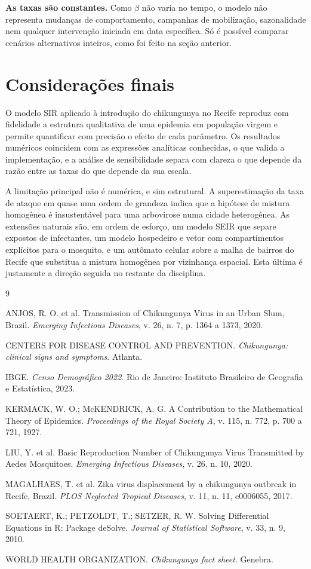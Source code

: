 \documentclass[11pt,a4paper]{article}
\begin{document}
\textbf{As taxas são constantes.} Como $\beta$ não varia no tempo, o modelo não representa mudanças de
comportamento, campanhas de mobilização, sazonalidade nem qualquer intervenção iniciada em data
específica. Só é possível comparar cenários alternativos inteiros, como foi feito na seção anterior.

\section{Considerações finais}

O modelo SIR aplicado à introdução do chikungunya no Recife reproduz com fidelidade a estrutura
qualitativa de uma epidemia em população virgem e permite quantificar com precisão o efeito de cada
parâmetro. Os resultados numéricos coincidem com as expressões analíticas conhecidas, o que valida a
implementação, e a análise de sensibilidade separa com clareza o que depende da razão entre as taxas do
que depende da sua escala.

A limitação principal não é numérica, e sim estrutural. A superestimação da taxa de ataque em quase uma
ordem de grandeza indica que a hipótese de mistura homogênea é insustentável para uma arbovirose numa
cidade heterogênea. As extensões naturais são, em ordem de esforço, um modelo SEIR que separe expostos de
infectantes, um modelo hospedeiro e vetor com compartimentos explícitos para o mosquito, e um autômato
celular sobre a malha de bairros do Recife que substitua a mistura homogênea por vizinhança espacial. Esta
última é justamente a direção seguida no restante da disciplina.

\begin{thebibliography}{9}

ANJOS, R. O. et al. Transmission of Chikungunya Virus in an Urban Slum, Brazil.
\textit{Emerging Infectious Diseases}, v. 26, n. 7, p. 1364 a 1373, 2020.

CENTERS FOR DISEASE CONTROL AND PREVENTION. \textit{Chikungunya: clinical signs and symptoms}. Atlanta.

IBGE. \textit{Censo Demográfico 2022}. Rio de Janeiro: Instituto Brasileiro de Geografia e Estatística,
2023.

KERMACK, W. O.; McKENDRICK, A. G. A Contribution to the Mathematical Theory of Epidemics.
\textit{Proceedings of the Royal Society A}, v. 115, n. 772, p. 700 a 721, 1927.

LIU, Y. et al. Basic Reproduction Number of Chikungunya Virus Transmitted by Aedes Mosquitoes.
\textit{Emerging Infectious Diseases}, v. 26, n. 10, 2020.

MAGALHAES, T. et al. Zika virus displacement by a chikungunya outbreak in Recife, Brazil.
\textit{PLOS Neglected Tropical Diseases}, v. 11, n. 11, e0006055, 2017.

SOETAERT, K.; PETZOLDT, T.; SETZER, R. W. Solving Differential Equations in R: Package deSolve.
\textit{Journal of Statistical Software}, v. 33, n. 9, 2010.

WORLD HEALTH ORGANIZATION. \textit{Chikungunya fact sheet}. Genebra.

\end{thebibliography}
\end{document}
